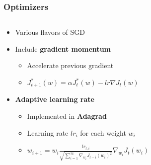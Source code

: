 \documentclass[aspectratio=169]{beamer}
\begin{document}
\begin{frame}
\frametitle{Optimizers}

\begin{columns}
\begin{column}{0.48\textwidth}
    \begin{itemize}
        \item Various flavors of SGD
        \item Include \textbf{gradient momentum}
        \begin{itemize}
            \item Accelerate previous gradient
            \item $J_{t+1}^{*}(w)=\alpha J_{t}^{*}(w) - lr\nabla J_t(w)$
        \end{itemize}
        \item \textbf{Adaptive learning rate}
        \begin{itemize}
            \item Implemented in \textbf{Adagrad}
            \item Learning rate $lr_i$ for each weight $w_i$
            \item $w_{i+1}=w_i \frac{lr_{t,i}}{\sqrt{\sum_{i=1}^{\infty} \nabla_{w_i}J_{t-i}(w_i)^2}}\nabla_{w_i} J_t(w_i)$
        \end{itemize}
    \end{itemize}
\end{column}
\begin{column}{0.48\textwidth}
\end{column}
\end{columns}
\end{frame}
\end{document}
